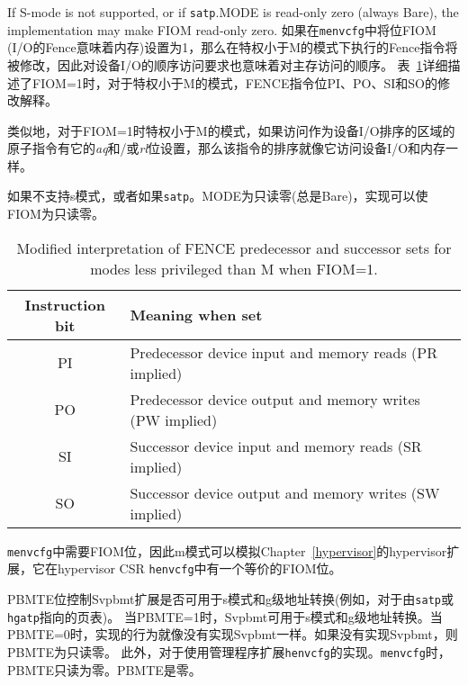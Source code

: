 {If S-mode is not supported, or if {\tt satp}.MODE is read-only zero
(always Bare), the implementation may make FIOM read-only zero.
\fi
如果在{\tt menvcfg}中将位FIOM (I/O的Fence意味着内存)设置为1，那么在特权小于M的模式下执行的Fence指令将被修改，因此对设备I/O的顺序访问要求也意味着对主存访问的顺序。
表~\ref{tab:menvcfg-FIOM}详细描述了FIOM=1时，对于特权小于M的模式，FENCE指令位PI、PO、SI和SO的修改解释。

类似地，对于FIOM=1时特权小于M的模式，如果访问作为设备I/O排序的区域的原子指令有它的{\em aq}和/或{\em rl}位设置，那么该指令的排序就像它访问设备I/O和内存一样。

如果不支持s模式，或者如果{\tt satp}。MODE为只读零(总是Bare)，实现可以使FIOM为只读零。

\begin{table}[h!]
\begin{center}
\begin{tabular}{|c|l|}
\hline
Instruction bit & Meaning when set \\
\hline
PI & Predecessor device input and memory reads   (PR implied) \\
PO & Predecessor device output and memory writes (PW implied) \\
\hline
SI & Successor device input and memory reads     (SR implied) \\
SO & Successor device output and memory writes   (SW implied) \\
\hline
\end{tabular}
\end{center}
\vspace{-0.1in}
\caption{%
Modified interpretation of FENCE predecessor and successor sets
for modes less privileged than M when FIOM=1.%
}
\label{tab:menvcfg-FIOM}
\end{table}

\iffalse
\begin{commentary}
Bit FIOM is needed in {\tt menvcfg} so M-mode can emulate the
hypervisor extension of Chapter~\ref{hypervisor}, which has an
equivalent FIOM bit in the hypervisor CSR {\tt henvcfg}.
\end{commentary}
\fi
\begin{commentary}
{\tt menvcfg}中需要FIOM位，因此m模式可以模拟Chapter~\ref{hypervisor}的hypervisor扩展，它在hypervisor CSR {\tt henvcfg}中有一个等价的FIOM位。
\end{commentary}

\iffalse
The PBMTE bit controls whether the Svpbmt extension is available for use in
S-mode and G-stage address translation (i.e., for page tables pointed to by
{\tt satp} or {\tt hgatp}).
When PBMTE=1, Svpbmt is available for S-mode and G-stage address translation.
When PBMTE=0, the implementation behaves as though Svpbmt were not implemented.
If Svpbmt is not implemented, PBMTE is read-only zero.
Furthermore, for implementations with the hypervisor extension,
{\tt henvcfg}.PBMTE is read-only zero if {\tt menvcfg}.PBMTE is zero.
\fi
PBMTE位控制Svpbmt扩展是否可用于s模式和g级地址转换(例如，对于由{\tt satp}或{\tt hgatp}指向的页表)。
当PBMTE=1时，Svpbmt可用于s模式和g级地址转换。当PBMTE=0时，实现的行为就像没有实现Svpbmt一样。如果没有实现Svpbmt，则PBMTE为只读零。
此外，对于使用管理程序扩展{\tt henvcfg}的实现。{\tt menvcfg}时，PBMTE只读为零。PBMTE是零。

}
